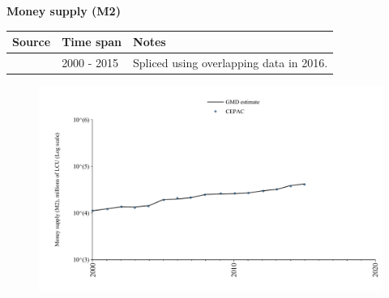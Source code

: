 \documentclass[12pt,a4paper,landscape]{article}
\begin{document}
\begin{adjustbox}{max totalsize={\paperwidth}{\paperheight},center}
\begin{minipage}[t][\textheight][t]{\textwidth}
\vspace*{0.5cm}
{}
\begin{center}
{\Large\bfseries Money supply (M2)}
\end{center}
\vspace{0.5cm}
\begin{table}[H]
\centering
\small
\begin{tabular}{|l|l|l|}
\hline
\textbf{Source} & \textbf{Time span} & \textbf{Notes} \\
\hline
\rowcolor{white}\cite{CEPAC}& 2000 - 2015 &Spliced using overlapping data in 2016. \\
\hline
\end{tabular}
\end{table}
\begin{figure}[H]
\centering
\includegraphics[width=\textwidth,height=0.6\textheight,keepaspectratio]{graphs/CUB_M2.pdf}
\end{figure}
\end{minipage}
\end{adjustbox}
\end{document}
